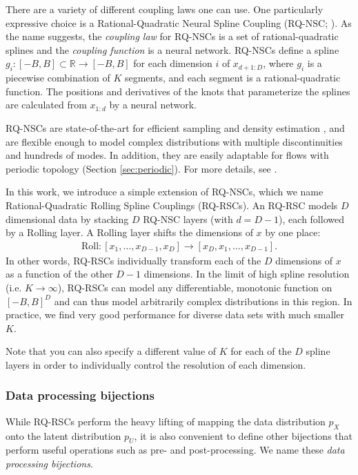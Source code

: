 \documentclass[twocolumn]{aastex631}
\newcommand{\px}{p^{}_{X}}
\newcommand{\pu}{p^{}_{U}}
\newcommand{\R}{\mathbb{R}}
\begin{document}
There are a variety of different coupling laws one can use.
One particularly expressive choice is a Rational-Quadratic Neural Spline Coupling (RQ-NSC; \citealt{durkan2019}).
As the name suggests, the \emph{coupling law} for RQ-NSCs is a set of rational-quadratic splines and the \emph{coupling function} is a neural network.
RQ-NSCs define a spline $g_i: [-B, B] \subset \R \to [-B, B]$ for each dimension $i$ of $x_{d+1:D}$, where $g_i$ is a piecewise combination of $K$ segments, and each segment is a rational-quadratic function.
The positions and derivatives of the knots that parameterize the splines are calculated from $x_{1:d}$ by a neural network.

RQ-NSCs are state-of-the-art for efficient sampling and density estimation \citep{kobyzev2020}, and are flexible enough to model complex distributions with multiple discontinuities and hundreds of modes.
In addition, they are easily adaptable for flows with periodic topology (Section \ref{sec:periodic}).
For more details, see \citet{durkan2019}.

In this work, we introduce a simple extension of RQ-NSCs, which we name Rational-Quadratic Rolling Spline Couplings (RQ-RSCs).
An RQ-RSC models $D$ dimensional data by stacking $D$ RQ-NSC layers (with $d=D-1$), each followed by a Rolling layer.
A Rolling layer shifts the dimensions of $x$ by one place:
\begin{align}
    \mathrm{Roll}: [x_1, \dots , x_{D-1}, x_D] \to [x_D, x_1, \dots , x_{D-1}].
\end{align}
In other words, RQ-RSCs individually transform each of the $D$ dimensions of $x$ as a function of the other $D-1$ dimensions.
In the limit of high spline resolution (i.e. $K \to \infty$), RQ-RSCs can model any differentiable, monotonic function on $[-B, B]^D$ and can thus model arbitrarily complex distributions in this region.
In practice, we find very good performance for diverse data sets with much smaller $K$.

Note that you can also specify a different value of $K$ for each of the $D$ spline layers in order to individually control the resolution of each dimension.

\subsubsection{Data processing bijections}
\label{sec:data-processing}

While RQ-RSCs perform the heavy lifting of mapping the data distribution $\px$ onto the latent distribution $\pu$, it is also convenient to define other bijections that perform useful operations such as pre- and post-processing.
We name these \emph{data processing bijections}.
\end{document}
